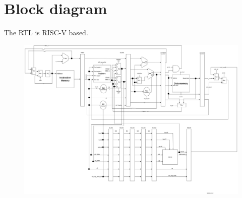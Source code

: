 \section{Block diagram}
The RTL is RISC-V based.

\begin{figure}[H]
    \centering
    \includegraphics[width=1.5\textwidth,  angle =90]{img/Diagrama-pag-set-final.png}
    \label{esquema}
\end{figure}

